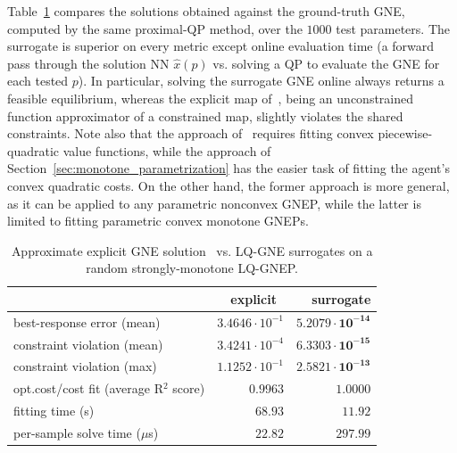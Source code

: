 \documentclass[11pt, a4paper]{article}
\renewcommand{\arraystretch}{1.3}
\theoremstyle{remark}
\theoremstyle{plain}
\begin{document}
Table~\ref{tab:surrogate_vs_explicit} compares the solutions obtained against the ground-truth GNE, computed by the same proximal-QP method, over the $1000$ test parameters. The surrogate is superior on every metric except online evaluation time (a forward pass through the solution NN $\hat x(p)$ vs. solving a QP to evaluate the GNE for each tested $p$). In particular, solving the surrogate GNE online always returns a feasible equilibrium, whereas the explicit map of~\cite{BT26}, being an unconstrained function approximator of a constrained map, slightly violates the shared constraints.
Note also that the approach of~\cite{BT26} requires fitting convex piecewise-quadratic value functions, while the approach of Section~\ref{sec:monotone_parametrization} has the easier task of fitting the agent's convex quadratic costs. On the other hand, the former approach is more general, as it can be applied to any parametric nonconvex GNEP, while the latter is limited to fitting parametric convex monotone GNEPs.

\begin{table}[t]
\centering
\setlength{\tabcolsep}{5pt}
\renewcommand{\arraystretch}{1.} %
\begin{tabular}{l|r|r}
\hline
 & explicit~\cite{BT26} & surrogate\\
\hline
best-response error (mean) & $ 3.4646 \cdot 10^{-1} $ & $ \mathbf{5.2079 \cdot 10^{-14}} $ \\
constraint violation (mean) & $ 3.4241 \cdot 10^{-4} $ & $ \mathbf{6.3303 \cdot 10^{-15}} $ \\
constraint violation (max) & $ 1.1252 \cdot 10^{-1} $ & $ \mathbf{2.5821 \cdot 10^{-13}} $ \\
opt.cost/cost fit (average R$^2$ score) & $ 0.9963 $ & $ \mathbf{1.0000} $ \\
fitting time (s) & $ 68.93 $ & $ \mathbf{11.92} $ \\
per-sample solve time ($\mu$s) & $ \mathbf{22.82} $ & $ 297.99 $ \\
\hline
\end{tabular}
\caption{Approximate explicit GNE solution~\cite{BT26} vs. LQ-GNE surrogates on a random strongly-monotone LQ-GNEP.}
\label{tab:surrogate_vs_explicit}
\end{table}
\end{document}
